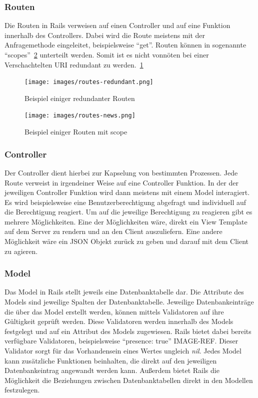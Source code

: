 \documentclass[paper=a4,fontsize=12pt,parskip=half]{scrartcl}
\newcommand{\hlnote}[2]{#1}
\newcommand{\hlnote}[2]{\todo{#2}\texthl{#1}}
\begin{document}

	\subsubsection{Routen}
	\label{sec: routen}
	Die Routen in Rails verweisen auf einen Controller und auf eine Funktion innerhalb des Controllers. Dabei wird die Route meistens mit der Anfragemethode eingeleitet, beispielsweise \enquote{get}. Routen können in sogenannte \enquote{scopes}~\ref{fig:routes-scope} unterteilt werden. Somit ist es nicht vonnöten bei einer Verschachtelten \gls{URI} redundant zu werden.~\ref{fig:routes-redundant}

	\begin{figure}
		\texttt{[image: images/routes-redundant.png]}
		\caption{Beispiel einiger redundanter Routen }
		\label{fig:routes-redundant}
	\end{figure}

	\begin{figure}
		\texttt{[image: images/routes-news.png]}
		\caption{Beispiel einiger Routen mit scope }
		\label{fig:routes-scope}
	\end{figure}

	\subsubsection{Controller}
	\label{sec: rails_controller}
	Der Controller dient hierbei zur Kapselung von bestimmten Prozessen. Jede Route verweist in irgendeiner Weise auf eine Controller Funktion. In der der jeweiligen Controller Funktion wird dann meistens mit einem Model interagiert. Es wird beispielsweise eine Benutzerberechtigung abgefragt und individuell auf die Berechtigung reagiert. Um auf die jeweilige Berechtigung zu reagieren gibt es mehrere Möglichkeiten. Eine der Möglichkeiten wäre, direkt ein View Template auf dem Server zu rendern und an den Client auszuliefern. Eine andere Möglichkeit wäre ein \gls{JSON} Objekt zurück zu geben und darauf mit dem Client zu agieren.

	\subsubsection{Model}
	\label{sec: rails_model}
	Das Model in Rails stellt jeweils eine Datenbanktabelle dar. Die Attribute des Models sind jeweilige Spalten der Datenbanktabelle. Jeweilige Datenbankeinträge die über das Model erstellt werden, können mittels Validatoren auf ihre Gültigkeit geprüft werden. Diese Validatoren werden innerhalb des Models festgelegt und auf ein Attribut des Models zugewiesen. Rails bietet dabei bereits verfügbare Validatoren, beispielsweise \enquote{presence: true} \hlnote{IMAGE-REF}{Bild Referenz}. Dieser Validator sorgt für das Vorhandensein eines Wertes ungleich \textit{nil}. Jedes Model kann zusätzliche Funktionen beinhalten, die direkt auf den jeweiligen Datenbankeintrag angewandt werden kann. Außerdem bietet Rails die Möglichkeit die Beziehungen zwischen Datenbanktabellen direkt in den Modellen festzulegen.
\end{document}
